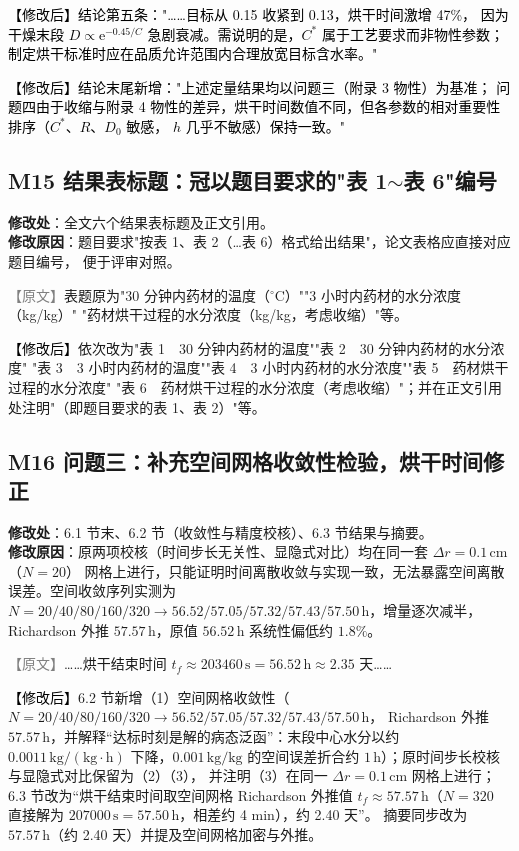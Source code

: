 \documentclass[UTF8,zihao=-4]{ctexart}
\newcommand{\yuanduan}[1]{\par\noindent\textcolor{gray}{\small 【原文】}#1\par}
\newcommand{\xinduan}[1]{\par\noindent\textcolor{black}{\small 【修改后】}#1\par}
\begin{document}
\noindent\textcolor{black}{\small 【修改后】结论第五条："……目标从 0.15 收紧到 0.13，烘干时间激增 47\%，
因为干燥末段 $D\propto\mathrm{e}^{-0.45/C}$ 急剧衰减。需说明的是，$C^{*}$ 属于工艺要求而非物性参数；
制定烘干标准时应在品质允许范围内合理放宽目标含水率。"}

\noindent\textcolor{black}{\small 【修改后】结论末尾新增："上述定量结果均以问题三（附录 3 物性）为基准；
问题四由于收缩与附录 4 物性的差异，烘干时间数值不同，但各参数的相对重要性排序（$C^{*}$、$R$、$D_0$ 敏感，
$h$ 几乎不敏感）保持一致。"}

\subsection*{M15 结果表标题：冠以题目要求的"表 1$\sim$表 6"编号}

\textbf{修改处}：全文六个结果表标题及正文引用。\\
\textbf{修改原因}：题目要求"按表 1、表 2（…表 6）格式给出结果"，论文表格应直接对应题目编号，
便于评审对照。

\yuanduan{\small 表题原为"30 分钟内药材的温度（$^\circ$C）""3 小时内药材的水分浓度（kg/kg）"
"药材烘干过程的水分浓度（kg/kg，考虑收缩）"等。}
\xinduan{\small 依次改为"表 1　30 分钟内药材的温度""表 2　30 分钟内药材的水分浓度"
"表 3　3 小时内药材的温度""表 4　3 小时内药材的水分浓度""表 5　药材烘干过程的水分浓度"
"表 6　药材烘干过程的水分浓度（考虑收缩）"；并在正文引用处注明"（即题目要求的表 1、表 2）"等。}

\subsection*{M16 问题三：补充空间网格收敛性检验，烘干时间修正}

\textbf{修改处}：6.1 节末、6.2 节（收敛性与精度校核）、6.3 节结果与摘要。\\
\textbf{修改原因}：原两项校核（时间步长无关性、显隐式对比）均在同一套 $\Delta r=0.1\,\mathrm{cm}$（$N=20$）
网格上进行，只能证明时间离散收敛与实现一致，无法暴露空间离散误差。空间收敛序列实测为
$N=20/40/80/160/320\to56.52/57.05/57.32/57.43/57.50\,\mathrm{h}$，增量逐次减半，Richardson 外推
$57.57\,\mathrm{h}$，原值 $56.52\,\mathrm{h}$ 系统性偏低约 $1.8\%$。

\yuanduan{……烘干结束时间 $t_f\approx203460\,\mathrm{s}=56.52\,\mathrm{h}\approx2.35$ 天……}
\xinduan{6.2 节新增（1）空间网格收敛性（$N=20/40/80/160/320\to56.52/57.05/57.32/57.43/57.50\,\mathrm{h}$，
Richardson 外推 $57.57\,\mathrm{h}$，并解释“达标时刻是解的病态泛函”：末段中心水分以约 $0.0011\,\mathrm{kg/(kg\cdot h)}$
下降，$0.001\,\mathrm{kg/kg}$ 的空间误差折合约 $1\,\mathrm{h}$）；原时间步长校核与显隐式对比保留为（2）（3），
并注明（3）在同一 $\Delta r=0.1\,\mathrm{cm}$ 网格上进行；6.3 节改为“烘干结束时间取空间网格 Richardson 外推值
$t_f\approx57.57\,\mathrm{h}$（$N=320$ 直接解为 $207000\,\mathrm{s}=57.50\,\mathrm{h}$，相差约 4 min），约 2.40 天”。
摘要同步改为 $57.57\,\mathrm{h}$（约 2.40 天）并提及空间网格加密与外推。}
\end{document}
